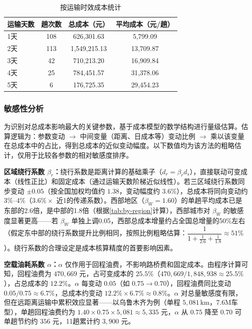 \begin{table}[!h]
    \centering
    \begin{tabular}{lccc}
        \toprule[1.5pt]
        运输天数 & 趟次数 & 总成本（元）& 平均成本（元/趟）\\
        \midrule[1pt]
        1天 & 108 & 626{,}301.63 & 5{,}799.09 \\
        2天 & 113 & 1{,}549{,}215.13 & 13{,}709.87 \\
        3天 & 42 & 710{,}213.20 & 16{,}909.84 \\
        4天 & 25 & 784{,}451.57 & 31{,}378.06 \\
        5天 & 6 & 176{,}725.35 & 29{,}454.23 \\
        \bottomrule[1.5pt]
    \end{tabular}\caption{按运输时效成本统计}
    \label{tab:by-time}

\end{table}

\subsubsection{敏感性分析}

为识别对总成本影响最大的关键参数，基于成本模型的数学结构进行量级估算。估算逻辑为：参数变动 $\to$ 中间变量（距离、日成本等）变动比例 $\to$ 乘以该变量在总成本中的占比，得到总成本的近似变动幅度。以下数值均为该方法的粗略估计，仅用于比较各参数的相对敏感度排序。

\textbf{区域绕行系数 $\beta_r$：}绕行系数是距离计算的基础乘子（$d_r = \beta_r d_s$），直接联动可变成本（线性正比）和固定成本（通过运输天数阶梯近似线性）。若三区域绕行系数同步变动 $\pm 0.05$（按全国加权均值约 $1.38$，变动幅度约 $3.6\%$），总成本将同向变动约 $3\%$–$4\%$（$3.6\% \times$ 近1的传递系数）。西部地区（$\beta_W = 1.60$）的单趟平均成本已是东部的2.6倍，是中部的1.8倍（根据\cref{tab:by-region}计算），西部城市对 $\beta_W$ 的敏感度显著更高——若 $\beta_W$ 单独上调0.05，西部总成本增量约占全国总增量的50\%左右（假定东中部的绕行系数提升比例相同，按照比例粗略估算：$\dfrac{1}{1+\frac{1}{2.6}+\frac{1}{1.8}}\approx 51\%$）。绕行系数的合理设定是成本核算精度的首要影响因素。

\textbf{空载油耗系数 $\alpha$：}$\alpha$ 仅作用于回程油费，不影响路桥费和固定成本。由程序计算可知，回程油费为 $470{,}669$ 元，占可变成本的 $25.5\%$（$470{,}669 / 1{,}848{,}938 \approx 25.5\%$），占总成本的 $12.2\%$。$\alpha$ 每变动 $0.05$（如 $0.75 \to 0.70$），回程油费同比变动 $0.05/0.75 \approx 6.7\%$，总成本约变动 $12.2\% \times 6.7\% \approx 0.8\%$。$\alpha$ 对总量敏感度有限，但在远距离运输中累积效应显著——以乌鲁木齐为例（单程 $5{,}081\,\mathrm{km}$，7.6M车型），单趟回程油费约为 $1.40 \times 0.75 \times 5{,}081 \approx 5{,}335$ 元，$\alpha$ 从 $0.75$ 降至 $0.70$ 可单趟节约约 $356$ 元，11趟累计约 $3{,}900$ 元。

